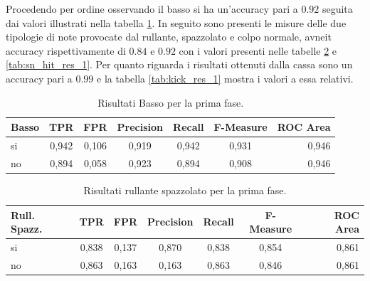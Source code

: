 Procedendo per ordine osservando il basso si ha un'accuracy pari a $0.92$ seguita dai valori illustrati nella tabella \ref{tab:cb_res_1}. In seguito sono presenti le misure delle due tipologie di note provocate dal rullante, spazzolato e colpo normale, avneit accuracy rispettivamente di $0.84$ e $0.92$ con i valori presenti nelle tabelle \ref{tab:sn_brush_res_1} e \ref{tab:sn_hit_res_1}. Per quanto riguarda i risultati ottenuti dalla cassa sono un accuracy pari a $0.99$ e la tabella \ref{tab:kick_res_1} mostra i valori a essa relativi.

\begin{table}[h!]
	\begin{center}
		\begin{tabular}{l|c|c|c|c|c|r} %
			\textbf{Basso} & \textbf{TPR} & \textbf{FPR} & \textbf{Precision} & \textbf{Recall} & \textbf{F-Measure} & \textbf{ROC Area}\\
			\hline
			si & 0,942 & 0,106 & 0,919 & 0,942 & 0,931 & 0,946 \\
			no & 0,894 & 0,058 & 0,923 & 0,894 & 0,908 & 0,946 \\
		\end{tabular}
		\caption{Risultati Basso per la prima fase.}
		\label{tab:cb_res_1}
	\end{center}
\end{table}

\begin{table}[h!]
	\begin{center}
		\begin{tabular}{l|c|c|c|c|c|r} %
			\textbf{Rull. Spazz.} & \textbf{TPR} & \textbf{FPR} & \textbf{Precision} & \textbf{Recall} & \textbf{F-Measure} & \textbf{ROC Area}\\
			\hline
			si & 0,838 & 0,137 & 0,870 & 0,838 & 0,854 & 0,861 \\
			no & 0,863 & 0,163 & 0,163 & 0,863 & 0,846 & 0,861 \\
		\end{tabular}
		\caption{Risultati rullante spazzolato per la prima fase.}
		\label{tab:sn_brush_res_1}
	\end{center}
\end{table}

